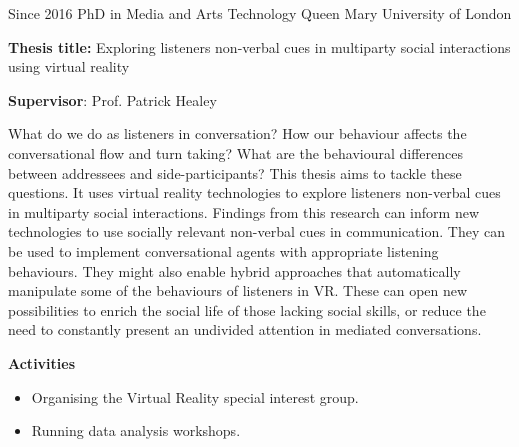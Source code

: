 \documentclass[]{friggeri-cv}
\begin{document}
\begin{entrylist}

    \entry
    {Since 2016}
    {PhD in Media and Arts Technology}
    {Queen Mary University of London}
    {
      \textbf{Thesis title:} Exploring listeners non-verbal cues in multiparty social interactions using virtual reality

      \textbf{Supervisor}: Prof. Patrick Healey

      What do we do as listeners in conversation?
      How our behaviour affects the conversational flow and turn taking?
      What are the behavioural differences between addressees and side-participants?
      This thesis aims to tackle these questions.
      It uses virtual reality technologies to explore listeners non-verbal cues in multiparty social interactions.
      Findings from this research can inform new technologies to use socially relevant non-verbal cues in communication.
      They can be used to implement conversational agents with appropriate listening behaviours.
      They might also enable hybrid approaches that automatically manipulate some of the behaviours of listeners in VR.
      These can open new possibilities to enrich the social life of those lacking social skills, or reduce the need to constantly present an undivided attention in mediated conversations.

      \textbf{Activities}
      \begin{itemize}
        \item
          Organising the Virtual Reality special interest group.
        \item
          Running data analysis workshops.
      \end{itemize}
    }

\end{entrylist}
\end{document}
